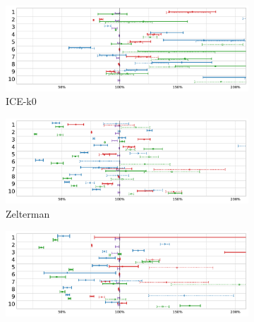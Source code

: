 \documentclass[sigconf,review,anonymous]{acmart}
\newcommand{\ICEallrare}{ICE-k0\xspace}
\newcommand{\Zelterman}{Zelterman\xspace}
\newcommand{\original}{\textsc{Original}\xspace}
\newcommand{\EvosuiteRandom}{\textsc{Random}\xspace}
\newcommand{\EvosuiteDynamosa}{\textsc{DynaMOSA}\xspace}
\begin{document}
\begin{figure}
\begin{subfigure}{.49\textwidth}
    \centering
      \includegraphics[width=0.95\linewidth]{charts/ggplot/estimators-no-title/ICE-k0.pdf}
\vspace*{-3mm}
\caption{\ICEallrare}
\end{subfigure}
\hfill
\begin{subfigure}{.49\textwidth}
    \centering
      \includegraphics[width=0.95\linewidth]{charts/ggplot/estimators-no-title/Zelterman.pdf}
\vspace*{-3mm}
\caption{\Zelterman}
\end{subfigure}
%
\begin{subfigure}{.49\textwidth}
    \centering
      \includegraphics[width=0.95\linewidth]{charts/ggplot/estimators-no-title/Chao-Bunge.pdf}

\end{subfigure}
\end{figure}
\end{document}
